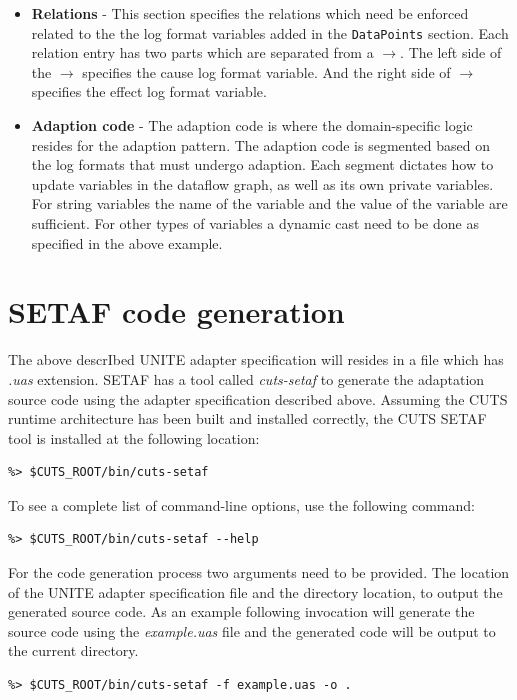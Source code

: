 \begin{itemize}
\item \textbf{Relations} - This section specifies the relations which need be enforced 
  related to the the log format variables added in the \texttt{DataPoints} section.
  Each relation entry has two parts which are separated from a $\rightarrow$. 
  The left side of the $\rightarrow$ specifies the cause log format variable. And 
  the right side of $\rightarrow$ specifies the effect log format variable.

\item \textbf{Adaption code} - The adaption code is where the
  domain-specific logic resides for the adaption pattern. The
  adaption code is segmented based on the log formats that must
  undergo adaption. Each segment dictates how to update variables
  in the dataflow graph, as well as its own private variables. For 
  string variables the name of the variable and the value of the variable 
  are sufficient. For other types of variables a dynamic cast need to be 
  done as specified in the above example. 

\end{itemize}

\section{SETAF code generation}
\label{sec:code-gen}

The above descrIbed UNITE adapter specification will resides in a file 
which has \textit{.uas} extension. SETAF has a tool called \textit{cuts-setaf} 
to generate the adaptation source code using the adapter specification 
described above. Assuming the CUTS runtime architecture has been built 
and installed correctly, the CUTS SETAF tool is installed at the following 
location:
\begin{lstlisting}
%> $CUTS_ROOT/bin/cuts-setaf
\end{lstlisting}
To see a complete list of command-line options, use the following 
command:
\begin{lstlisting}
%> $CUTS_ROOT/bin/cuts-setaf --help
\end{lstlisting} 

For the code generation process two arguments need to be provided. The 
location of the UNITE adapter specification file and the directory 
location, to output the generated source code. As an example following 
invocation will generate the source code using the \textit{example.uas} 
file and the generated code will be output to the current directory.
\begin{lstlisting}
%> $CUTS_ROOT/bin/cuts-setaf -f example.uas -o .
\end{lstlisting}

